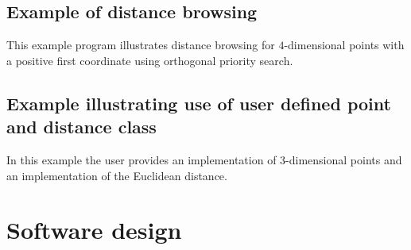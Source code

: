 

\subsection{Example of distance browsing}

This example program illustrates distance browsing for $4$-dimensional
points with a positive first coordinate using orthogonal priority
search.

 


\subsection{Example illustrating use of user defined point and distance class}

In this example the user provides an implementation of 3-dimensional points and an
implementation of the Euclidean distance.


\section{Software design}

